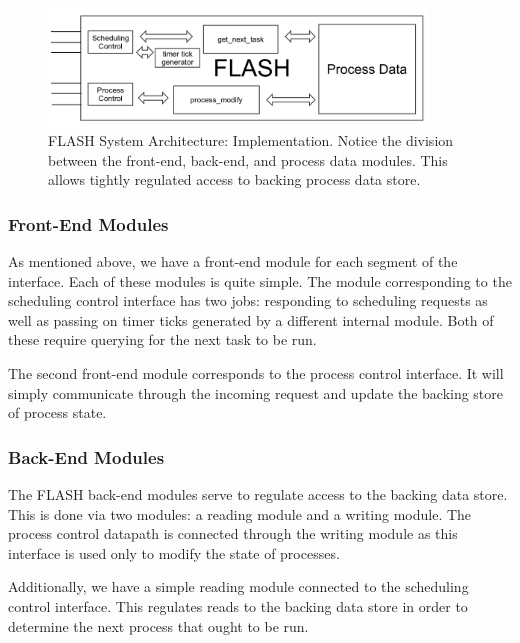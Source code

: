 \documentclass{sig-alternate-10pt}
\begin{document}
\begin{figure}
	\begin{center}
		\includegraphics[width=0.9\textwidth]{fig/flash-impl.png}
		\caption{
			FLASH System Architecture: Implementation.  Notice the division
			between the front-end, back-end, and process data modules.  This
			allows tightly regulated access to backing process data store.
		}
		\label{fig:impl_overview}
	\end{center}
\end{figure}

\subsubsection{Front-End Modules}
As mentioned above, we have a front-end module for each segment of the
interface.  Each of these modules is quite simple.  The module corresponding
to the scheduling control interface has two jobs: responding to scheduling requests
as well as passing on timer ticks generated by a different internal module.
Both of these require querying for the next task to be run.

The second front-end module corresponds to the process control interface.
It will simply communicate through the incoming request and update the
backing store of process state.

\subsubsection{Back-End Modules}
The FLASH back-end modules serve to regulate access to the backing data
store.  This is done via two modules: a reading module and a writing module.
The process control datapath is connected through the writing module as this
interface is used only to modify the state of processes.

Additionally, we have a simple reading module connected to the scheduling
control interface.  This regulates reads to the backing data store in order
to determine the next process that ought to be run.
\end{document}
